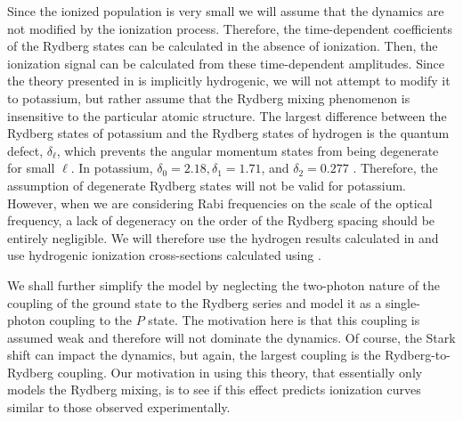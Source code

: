 Since the ionized population is very small we will assume that the dynamics are
not modified by the ionization process.  Therefore, the time-dependent
coefficients of the Rydberg states can be calculated in the absence of
ionization.  Then, the ionization signal can be calculated from these
time-dependent amplitudes.  Since the theory presented in  is
implicitly hydrogenic, we will not attempt to modify it to potassium, but rather
assume that the Rydberg mixing phenomenon is insensitive to the particular
atomic structure.  The largest difference between the Rydberg states of
potassium and the Rydberg states of hydrogen is the quantum defect,
$\delta_{\ell}$, which prevents the angular momentum states from being
degenerate for small $\ell$.  In potassium,
$\delta_0 = 2.18, \delta_1 = 1.71$, and $\delta_2 = 0.277$
\cite{Gallagher_book}.  Therefore, the assumption of degenerate Rydberg states
will not be valid for potassium.  However, when we are considering Rabi
frequencies on the scale of the optical frequency, a lack of degeneracy on the
order of the Rydberg spacing should be entirely negligible.  We will therefore
use the hydrogen results calculated in  and use hydrogenic
ionization cross-sections calculated using .

We shall further simplify the model by neglecting the two-photon nature of the
coupling of the ground state to the Rydberg series and model it as a
single-photon coupling to the $P$ state.  The motivation here is that this
coupling is assumed weak and therefore will not dominate the dynamics.  Of
course, the Stark shift can impact the dynamics, but again, the largest
coupling is the Rydberg-to-Rydberg coupling.  Our motivation in using this
theory, that essentially only models the Rydberg mixing, is to see if this effect
predicts ionization curves similar to those observed experimentally.

